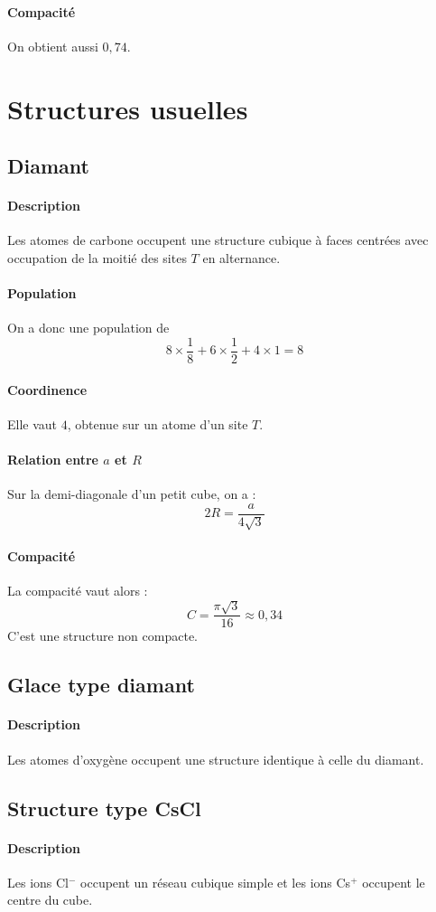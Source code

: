 \documentclass[french]{book}
\theoremstyle{plain}
\theoremstyle{definition}
\theoremstyle{remark}
\begin{document}
\paragraph{Compacité} On obtient aussi $0,74$.
\section{Structures usuelles}
\subsection{Diamant}
\paragraph{Description} Les atomes de carbone occupent une structure cubique à faces centrées avec occupation de la moitié des sites $T$ en alternance.
\paragraph{Population} On a donc une population de $$8\times\frac{1}{8}+6\times\frac12+4\times 1=8$$
\paragraph{Coordinence} Elle vaut $4$, obtenue sur un atome d'un site $T$.
\paragraph{Relation entre $a$ et $R$} Sur la demi-diagonale d'un petit cube, on a : $$2R=\frac{a}{4\sqrt{3}}$$
\paragraph{Compacité} La compacité vaut alors : $$C=\frac{\pi\sqrt{3}}{16}\approx 0,34$$ C'est une structure non compacte.
\subsection{Glace type diamant}
\paragraph{Description} Les atomes d'oxygène occupent une structure identique à celle du diamant.
\subsection{Structure type CsCl}
\paragraph{Description} Les ions Cl$^-$ occupent un réseau cubique simple et les ions Cs$^+$ occupent le centre du cube.
\end{document}
